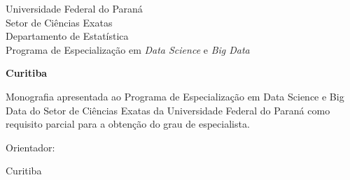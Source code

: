 \onecolumn
\thispagestyle{empty}
\begin{center}
  \linespread{1.25}
  \sffamily

  {\LARGE
    Universidade Federal do Paraná\\
    Setor de Ciências Exatas\\
    Departamento de Estatística\\
    Programa de Especialização em \emph{Data Science} e \emph{Big Data}\\
    \par
  }

  \vspace{4em}

  {\Large \capaautor}

  \vspace{21em}

  \begin{minipage}{0.9\linewidth}
    \begin{center}
      {\huge\bfseries \capatitulo\par}
    \end{center}
  \end{minipage}

  \vfill
  {\Large\bfseries
    Curitiba\\
    \capaano\par
  }

\end{center}
\newpage

\thispagestyle{empty}
\begin{center}
  \linespread{1.25}
  \sffamily

  {\Large \capaautor}

  \vspace{21em}

  \begin{minipage}{0.9\linewidth}
    \begin{center}
      {\LARGE\bfseries \capatitulo\par}
    \end{center}
  \end{minipage}

  \vspace{11em}

  \hfill
  \begin{minipage}{0.5\linewidth}
    \linespread{1.1}
    \large\rmfamily

    Monografia apresentada ao Programa de Especialização em Data Science
    e Big Data do Setor de Ciências Exatas da Universidade Federal do Paraná 
    como requisito parcial para a obtenção do grau de especialista.
    \newline

    Orientador: \capaorientador

  \end{minipage}

  \vfill
  {\Large\rmfamily
    Curitiba\\
    \capaano\par
  }

\end{center}
\newpage
